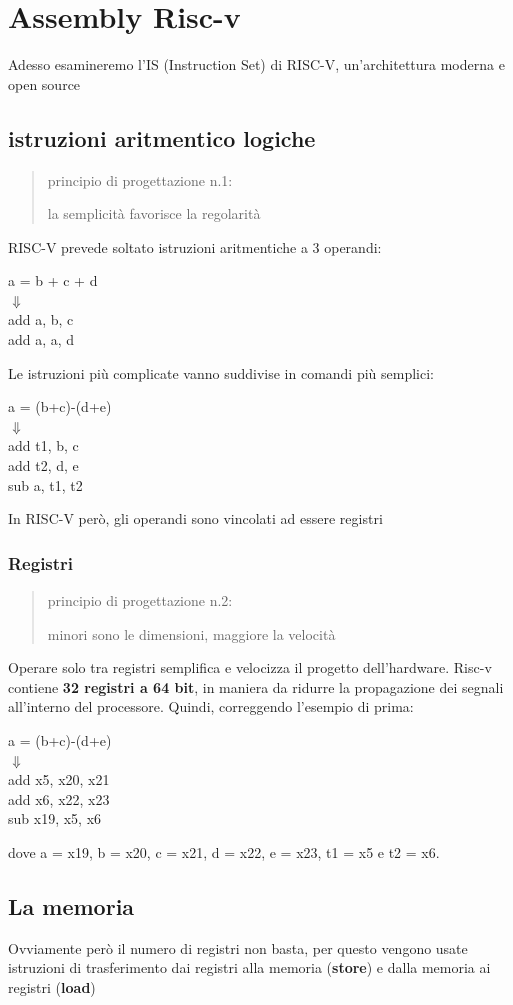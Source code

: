 \documentclass[12pt, a4paper]{article}
\begin{document}
\section{Assembly Risc-v}
Adesso esamineremo l'IS (Instruction Set) di RISC-V, un'architettura moderna e open source

\subsection{istruzioni aritmentico logiche}
\begin{quote}
  \center principio di progettazione n.1: 

  la semplicità favorisce la regolarità
\end{quote}

RISC-V prevede soltato istruzioni aritmentiche a 3 operandi:
\begin{center}
  a = b + c + d\\
  $\Downarrow$\\
  add a, b, c\\
  add a, a, d\\
\end{center}

Le istruzioni più complicate vanno suddivise in comandi più semplici:
\begin{center}
  a = (b+c)-(d+e)\\
  $\Downarrow$\\
  add t1, b, c \\
  add t2, d, e \\
  sub a, t1, t2\\
\end{center}  
In RISC-V però, gli operandi sono vincolati ad essere registri

\subsubsection{Registri}
\begin{quote}
  \center principio di progettazione n.2:
  
  minori sono le dimensioni, maggiore la velocità
\end{quote}
Operare solo tra registri semplifica e velocizza il progetto dell'hardware. 
Risc-v contiene \textbf{32 registri a 64 bit}, in maniera da ridurre la propagazione dei segnali 
all'interno del processore. Quindi, correggendo l'esempio di prima:
\begin{center}
  a = (b+c)-(d+e)\\
  $\Downarrow$\\
  add x5, x20, x21 \\
  add x6, x22, x23\\
  sub x19, x5, x6\\
\end{center} 
dove a = x19, b = x20, c = x21, d = x22, e = x23, t1 = x5 e t2 = x6.

\subsection{La memoria}
Ovviamente però il numero di registri non basta, per questo vengono usate istruzioni di 
trasferimento dai registri alla memoria (\textbf{store}) e dalla memoria ai registri
(\textbf{load}) 
\end{document}
